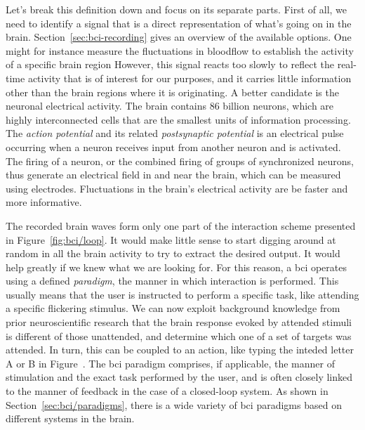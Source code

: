 Let's break this definition down and focus on its separate parts.
First of all, we need to identify a signal that is a direct representation of
what's going on in the brain.
Section~\ref{sec:bci-recording} gives an overview of the available options.
One might for instance measure the fluctuations in bloodflow to establish the
activity of a specific brain region
However, this signal reacts too slowly to reflect the real-time activity that is
of interest for our purposes, and it carries little information other than the
brain regions where it is originating.
A better candidate is the neuronal electrical activity.
The brain contains 86 billion neurons, which are highly interconnected cells that are
the smallest units of information processing.
The \emph{action potential} and its related \emph{postsynaptic potential}
is an electrical pulse occurring when a neuron receives
input from another neuron and is activated.
The firing of a neuron, or the combined firing of groups of
synchronized neurons, thus generate an electrical field in and near the brain,
which can be measured using electrodes.
Fluctuations in the brain's electrical activity are be faster and more
informative.

The recorded brain waves form only one part of the interaction scheme presented
in Figure~\ref{fig:bci/loop}.
It would make little sense to start digging around at random in all the brain
activity to try to extract the desired output.
It would help greatly if we knew what we are looking for.
For this reason, a \ac{bci} operates using a defined \emph{paradigm}, the manner in
which interaction is performed.
This usually means that the user is instructed to perform a specific task, like
attending a specific flickering stimulus.
We can now exploit background knowledge from prior neuroscientific research
that the brain response evoked by attended stimuli is different of those
unattended,
and determine which one of a set of targets was attended.
In turn, this can be coupled to an action, like typing the inteded letter A or B
in Figure~\cite{fig:bci/loop}.
The \ac{bci} paradigm comprises, if applicable, the manner of stimulation and the
exact task performed by the user, and is often closely linked to the manner of
feedback in the case of a closed-loop system.
As shown in Section~\ref{sec:bci/paradigms}, there is a wide variety of \ac{bci}
paradigms based on different systems in the brain.

